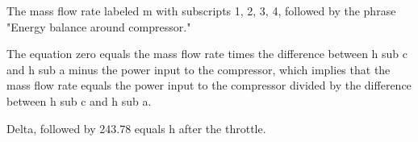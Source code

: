 The mass flow rate labeled m with subscripts 1, 2, 3, 4, followed by the phrase "Energy balance around compressor."

The equation zero equals the mass flow rate times the difference between h sub c and h sub a minus the power input to the compressor, which implies that the mass flow rate equals the power input to the compressor divided by the difference between h sub c and h sub a.

Delta, followed by 243.78 equals h after the throttle.